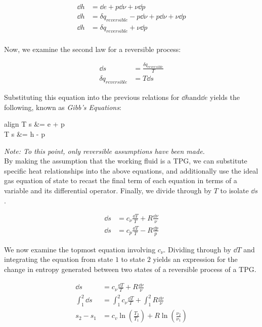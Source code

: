 \documentclass[12pt,letterpaper]{article}
\begin{document}
\begin{enumerate}[label=(\alph*)]
\begin{enumerate}[label=\arabic*.]
			\begin{align*}
				\dd h &= \dd e + p\dd \nu + \nu \dd p\\
				\dd h &= \delta q_{reversible} - p\dd \nu + p\dd \nu + \nu \dd p\\
				\dd h &= \delta q_{reversible} + \nu \dd p\\
			\end{align*}

			Now, we examine the second law for a reversible process:

			\begin{align*}
				\dd s &= \frac{\delta q_{reversible}}{T}\\
				\delta q_{reversible} &= T \dd s
			\end{align*}

			Substituting this equation into the previous relations for $\dd h \textrm{and} \dd e$ yields the following, known as \textit{Gibb's Equations}:

			\begin{empheq}[box=\fbox]{align}
				T \dd s &= \dd e + p \dd \nu \nonumber \\
				T \dd s &= \dd h - \nu \dd p \nonumber
			\end{empheq}
			
			\textit{Note: To this point, only reversible assumptions have been made.}\\

			By making the assumption that the working fluid is a TPG, we can substitute specific heat relationships into the above equations, and additionally use the ideal gas equation of state to recast the final term of each equation in terms of a variable and its differential operator.
			Finally, we divide through by $T$ to isolate $\dd s$.

			\begin{align*}
				\dd s &= c_\nu \frac{\dd T}{T} + R {\frac{\dd \nu}{\nu}}\\
				\dd s &= c_p \frac{\dd T}{T} - R {\frac{\dd p}{p}} 
			\end{align*}
			
			We now examine the topmost equation involving $c_\nu$. Dividing through by $\dd T$ and integrating the equation from state $1$ to state $2$ yields an expression for the change in entropy generated between two states of a reversible process of a TPG.

			\begin{align*}
				\dd s &= c_\nu \frac{\dd T}{T} + R{\frac{\dd \nu}{\nu}}\\
				\int_1^2 \dd s &= \int_1^2 c_\nu \frac{\dd T}{T} + \int_1^2 R{\frac{\dd \nu}{\nu}}\\
				s_2 - s_1 &= c_v \ln{\left(\frac{T_2}{T_1}\right)} + R \ln{\left(\frac{\nu_2}{\nu_1}\right)}
			\end{align*}


\end{enumerate}
\end{enumerate}
\end{document}
